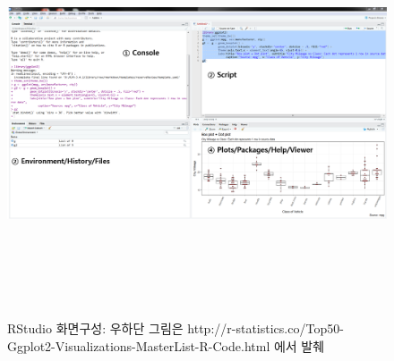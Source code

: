 \documentclass[12pt,a4paper]{book}
\theoremstyle{definition}
\theoremstyle{definition}
\theoremstyle{definition}
\theoremstyle{remark}
\begin{document}
\begin{figure}[H]
{
  \centering
  \includegraphics[width = 14cm, height = 12cm]{Figures/Rstudio-cap1.png}
  \caption[RStudio 화면구성]{RStudio 화면구성: 우하단 그림은 http://r-statistics.co/Top50-Ggplot2-Visualizations-MasterList-R-Code.html 에서 발췌}\label{fig:Rstudio-part-01}
}
\end{figure}
\end{document}
